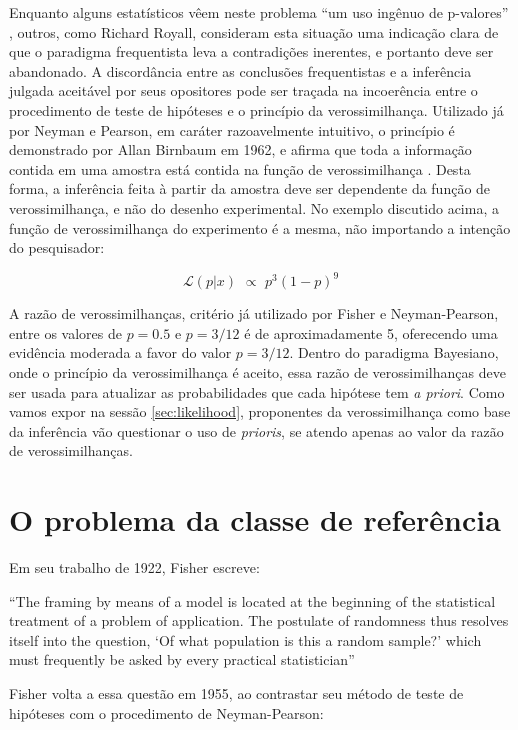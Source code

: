 Enquanto alguns estatísticos vêem neste problema ``um uso ingênuo de p-valores'' \citep{Good92}, outros, como Richard Royall,
consideram esta situação uma indicação clara de que o paradigma frequentista leva a contradições inerentes, e portanto 
deve ser abandonado. A discordância entre as conclusões frequentistas e a inferência julgada aceitável por seus opositores 
pode ser traçada na incoerência entre
o procedimento de teste de hipóteses e o princípio da verossimilhança. Utilizado já por Neyman e Pearson\citep{Neyman33},
em caráter razoavelmente intuitivo, o princípio é demonstrado por Allan Birnbaum em 1962, 
e afirma que toda a informação contida em uma amostra está	contida na função de verossimilhança \citep{Birnbaum62}. 
Desta forma, a inferência feita à partir da amostra deve ser dependente da função de verossimilhança, e não do desenho
experimental.
No exemplo discutido acima, a função de verossimilhança do experimento é a mesma, não importando a intenção do pesquisador:

\begin{equation}
	\mathcal{L}(p|x) \,\, \propto \,\, p^3(1-p)^9
\end{equation}

A razão de verossimilhanças, critério já utilizado por Fisher e Neyman-Pearson, entre os valores de $p=0.5$ e $p=3/12$ é de 
aproximadamente 5, oferecendo uma evidência moderada a favor do valor $p=3/12$. Dentro do paradigma Bayesiano, onde o princípio
da verossimilhança é aceito, essa razão de verossimilhanças deve ser usada para atualizar as probabilidades que cada hipótese
tem {\em a priori}. Como vamos expor na sessão \ref{sec:likelihood}, proponentes da verossimilhança como base da inferência
vão questionar o uso de {\em prioris}, se atendo apenas ao valor da razão de verossimilhanças.

\section{O problema da classe de referência}\label{sec:classref}

Em seu trabalho de 1922, Fisher escreve:

``The framing by means of a model is located at the beginning of the
statistical treatment of a problem of application. The postulate of randomness thus resolves itself into the 
question, `Of what population is this a random sample?' which must frequently be asked by every practical
statistician''\citep{Fisher1922}

Fisher volta a essa questão em 1955, ao contrastar seu método de teste de hipóteses com o procedimento de Neyman-Pearson:

